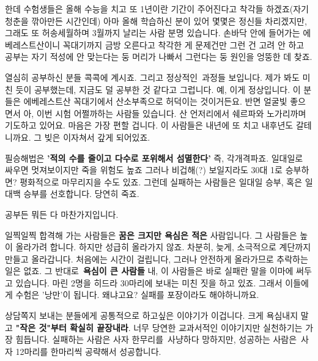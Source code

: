 한데 수험생들은 올해 수능을 치고 또 1년이란 기간이 주어진다고 착각들 하겠죠(자기 청춘을 깎아만든 시간인데)
아마 올해 학습하신 분이 있어 몇몇은 정신들 차리겠지만, 그래도 또 허송세월하며 3월까지 날리는 사람 분명 있습니다.
손바닥 안에 들어가는 에베레스트산이니 꼭대기까지 금방 오른다고 착각한 게 문제건만
그런 건 고려 안 하고 공부는 자기 적성에 안 맞는다는 둥 머리가 나빠서 그런다는 둥 원인을 엉뚱한 데 찾죠.
\vspace{5mm}

열심히 공부하신 분들 콕콕에 계시죠. 그리고 정상적인 과정들 보입니다.
제가 봐도 미친 듯이 공부했는데, 지금도 덜 공부한 것 같다고 그럽니다. 예, 이게 정상입니다.
이 분들은 에베레스트산 꼭대기에서 산소부족으로 허덕이는 것이거든요.
반면 얼굴빛 좋으면서 아, 이번 시험 어쩔까하는 사람들 있습니다. 산 언저리에서 쉐르파와 노가리까며 기도하고 있어요.
마음은 가장 편할 겁니다. 이 사람들은 내년에 또 치고 내후년도 갈테니까요. 그 빚은 이자쳐서 갚게 되어있죠.
\vspace{5mm}

필승해법은
\textbf{'적의 수를 줄이고 다수로 포위해서 섬멸한다'}
즉, 각개격파죠.
일대일로 싸우면 멋져보이지만 죽을 위험도 높죠
그러나 비겁해(?) 보일지라도 30대 1로 승부하면? 평화적으로 마무리지을 수도 있죠.
그런데 실패하는 사람들은 일대일 승부, 혹은 일대백 승부를 선호합니다. 당연히 죽죠.
\vspace{5mm}

공부든 뭐든 다 마찬가지입니다.
\vspace{5mm}

일찍일찍 합격해 가는 사람들은 \textbf{꿈은 크지만 욕심은 적은} 사람입니다.
그 사람들은 높이 올라가려 합니다. 하지만 성급히 올라가지 않죠. 차분히, 늦게, 소극적으로 계단까지 만들고 올라갑니다.
처음에는 시간이 걸립니다, 그러나 안전하게 올라가므로 추락하는 일은 없죠.
그 반대로 \textbf{욕심이 큰 사람들}
내, 이 사람들은 바로 실패란 말을 이마에 써두고 있습니다.
마린 2명을 히드라 30마리에 보내는 미친 짓을 하고 있죠.
그래서 이들에게 수험은 '낭만'이 됩니다. 왜냐고요? 실패를 포장이라도 해야하니까요.
\vspace{5mm}

상담쪽지 보내는 분들에게 공통적으로 하고싶은 이야기가 이겁니다.
크게 욕심내지 말고 \textbf{"작은 것"부터 확실히 끝장내라}.
너무 당연한 교과서적인 이야기지만 실천하기는 가장 힘듭니다.
실패하는 사람은 사자 한무리를 사냥하다 망하지만, 성공하는 사람은 사자 12마리를 한마리씩 공략해서 성공합니다.
\vspace{5mm}







